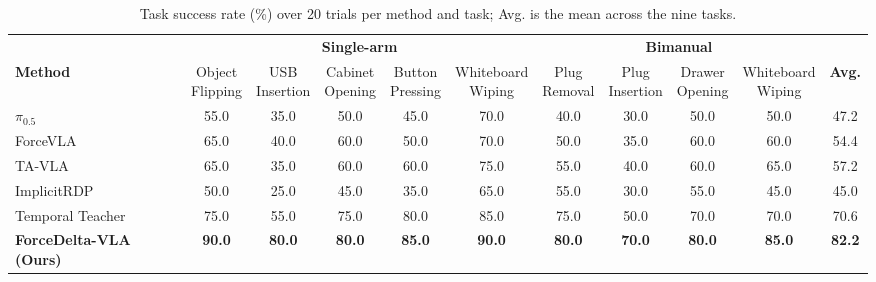 \begin{table}[!t]
    \centering
    \scriptsize
    \setlength{\tabcolsep}{3pt}
    \caption{Task success rate (\%) over 20 trials per method and task; Avg. is the mean across the nine tasks.}
    \label{tab:main_results}
    \begin{tabular}{lcccccccccc}
        \toprule
        & \multicolumn{5}{c}{\textbf{Single-arm}} & \multicolumn{4}{c}{\textbf{Bimanual}} & \\
        \cmidrule(lr){2-6}\cmidrule(lr){7-10}
        \textbf{Method}
        & \shortstack{Object\\Flipping}
        & \shortstack{USB\\Insertion}
        & \shortstack{Cabinet\\Opening}
        & \shortstack{Button\\Pressing}
        & \shortstack{Whiteboard\\Wiping}
        & \shortstack{Plug\\Removal}
        & \shortstack{Plug\\Insertion}
        & \shortstack{Drawer\\Opening}
        & \shortstack{Whiteboard\\Wiping}
        & \textbf{Avg.} \\
        \midrule
        $\pi_{0.5}$~\cite{intelligence2025pi05visionlanguageactionmodelopenworld} & 55.0 & 35.0 & 50.0 & 45.0 & 70.0 & 40.0 & 30.0 & 50.0 & 50.0 & 47.2 \\
        ForceVLA~\cite{yu2025forcevlaenhancingvlamodels} & 65.0 & 40.0 & 60.0 & 50.0 & 70.0 & 50.0 & 35.0 & 60.0 & 60.0 & 54.4 \\
        TA-VLA~\cite{zhang2025tavlaelucidatingdesignspace} & 65.0 & 35.0 & 60.0 & 60.0 & 75.0 & 55.0 & 40.0 & 60.0 & 65.0 & 57.2 \\
        ImplicitRDP~\cite{chen2026implicitrdpendtoendvisualforcediffusion} & 50.0 & 25.0 & 45.0 & 35.0 & 65.0 & 55.0 & 30.0 & 55.0 & 45.0 & 45.0 \\
        Temporal Teacher & 75.0 & 55.0 & 75.0 & 80.0 & 85.0 & 75.0 & 50.0 & 70.0 & 70.0 & 70.6 \\
        \textbf{ForceDelta-VLA (Ours)} & \textbf{90.0} & \textbf{80.0} & \textbf{80.0} & \textbf{85.0} & \textbf{90.0} & \textbf{80.0} & \textbf{70.0} & \textbf{80.0} & \textbf{85.0} & \textbf{82.2} \\
        \bottomrule
    \end{tabular}
\end{table}

